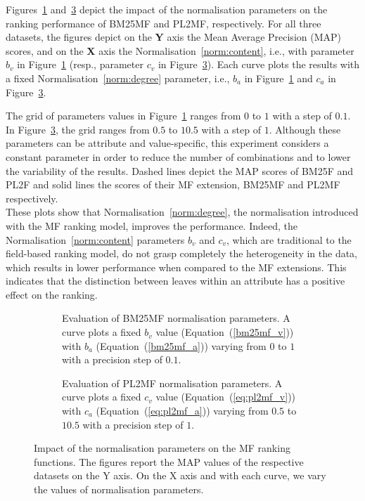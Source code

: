 Figures~\ref{fig:bm25mf-norm} and~\ref{fig:pl2mf-norm} depict the impact of the normalisation parameters on the ranking performance of \gls{BM25MF} and \gls{PL2MF}, respectively. For all three datasets, the figures depict on the \textbf{Y} axis the Mean Average Precision (MAP) scores, and on the \textbf{X} axis the Normalisation~\ref{norm:content}, i.e., with parameter $b_v$ in Figure~\ref{fig:bm25mf-norm} (resp., parameter $c_v$ in Figure~\ref{fig:pl2mf-norm}). Each curve plots the results with a fixed Normalisation~\ref{norm:degree} parameter, i.e., $b_a$ in Figure~\ref{fig:bm25mf-norm} and $c_a$ in Figure~\ref{fig:pl2mf-norm}.

The grid of parameters values in Figure~\ref{fig:bm25mf-norm} ranges from $0$ to $1$ with a step of $0.1$. In Figure~\ref{fig:pl2mf-norm}, the grid ranges from $0.5$ to $10.5$ with a step of $1$. Although these parameters can be attribute and value-specific, this experiment considers a constant parameter in order to reduce the number of combinations and to lower the variability of the results. Dashed lines depict the MAP scores of BM25F and PL2F and solid lines the scores of their \gls{MF} extension, \gls{BM25MF} and \gls{PL2MF} respectively.\\

These plots show that Normalisation~\ref{norm:degree}, the normalisation introduced with the \gls{MF} ranking model, improves the performance. Indeed, the Normalisation~\ref{norm:content} parameters $b_v$ and $c_v$, which are traditional to the field-based ranking model, do not grasp completely the heterogeneity in the data, which results in lower performance when compared to the \gls{MF} extensions. This indicates that the distinction between leaves within an attribute has a positive effect on the ranking.

\begin{figure}
	\centering
	\begin{subfigure}{\textwidth}
		\centering
		
		\addtocounter{subfigure}{-1}
		\caption{Evaluation of BM25MF normalisation parameters. A curve plots a fixed $b_v$ value (Equation~(\ref{bm25mf_v})) with $b_a$ (Equation~(\ref{bm25mf_a})) varying from $0$ to $1$ with a precision step of $0.1$.}
		\label{fig:bm25mf-norm}
	\end{subfigure}
	\qquad
	\begin{subfigure}{\textwidth}
		\centering
		
		\addtocounter{subfigure}{-1}
		\caption{Evaluation of PL2MF normalisation parameters. A curve plots a fixed $c_v$ value (Equation~(\ref{eq:pl2mf_v})) with $c_a$ (Equation~(\ref{eq:pl2mf_a})) varying from $0.5$ to $10.5$ with a precision step of $1$.}
		\label{fig:pl2mf-norm}
	\end{subfigure}
	\caption[Impact of the normalisation parameters on the MF ranking functions]{Impact of the normalisation parameters on the \gls{MF} ranking functions. The figures report the MAP values of the respective datasets on the Y axis. On the X axis and with each curve, we vary the values of normalisation parameters.}
\end{figure}

